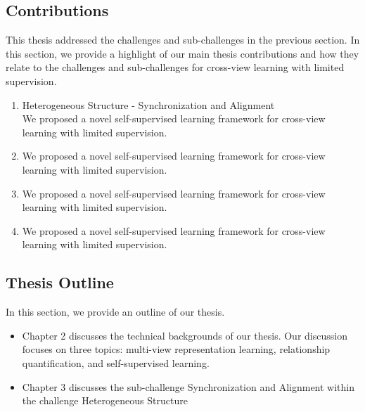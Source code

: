 \subsection{Contributions}

This thesis addressed the challenges and sub-challenges in the previous section. In this section, we provide
a highlight of our main thesis contributions and how they relate to the challenges and sub-challenges for
cross-view learning with limited supervision.

\begin{enumerate}
    \item Heterogeneous Structure - Synchronization and Alignment
          \\ We proposed a novel self-supervised learning framework for cross-view learning with limited supervision.
    \item We proposed a novel self-supervised learning framework for cross-view learning with limited supervision.
    \item We proposed a novel self-supervised learning framework for cross-view learning with limited supervision.
    \item We proposed a novel self-supervised learning framework for cross-view learning with limited supervision.
\end{enumerate}

\subsection{Thesis Outline}

In this section, we provide an outline of our thesis.

\begin{itemize}
    \item  Chapter 2 discusses the technical backgrounds of our thesis. Our discussion focuses on three topics: multi-view
          representation learning, relationship quantification, and self-supervised learning.
    \item Chapter 3 discusses the sub-challenge Synchronization and Alignment within the challenge Heterogeneous
          Structure
\end{itemize}